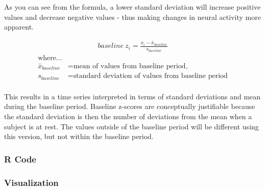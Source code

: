 \documentclass[
]{book}
\newenvironment{Shaded}{\begin{snugshade}}{\end{snugshade}}
\newcommand{\CommentTok}[1]{\textcolor[rgb]{0.56,0.35,0.01}{\textit{#1}}}
\newcommand{\DataTypeTok}[1]{\textcolor[rgb]{0.13,0.29,0.53}{#1}}
\newcommand{\DecValTok}[1]{\textcolor[rgb]{0.00,0.00,0.81}{#1}}
\newcommand{\KeywordTok}[1]{\textcolor[rgb]{0.13,0.29,0.53}{\textbf{#1}}}
\newcommand{\NormalTok}[1]{#1}
\newcommand{\OperatorTok}[1]{\textcolor[rgb]{0.81,0.36,0.00}{\textbf{#1}}}
\newcommand{\StringTok}[1]{\textcolor[rgb]{0.31,0.60,0.02}{#1}}
\begin{document}
As you can see from the formula, a lower standard deviation will increase positive values and decrease negative values - thus making changes in neural activity more apparent.

\begin{gather*}
  baseline \ z_{i} = \frac{x_{i}-\bar{x}_{baseline}}{s_{baseline}}
\end{gather*}
\begin{align*}
  \text{where...} \\
  \bar{x}_{baseline} &= \text{mean of values from baseline period,} \\
  {s}_{baseline} &= \text{standard deviation of values from baseline period} \\
\end{align*}

This results in a time series interpreted in terms of standard deviations and mean during the baseline period. Baseline z-scores are conceptually justifiable because the standard deviation is then the number of deviations from the mean when a subject is at rest. The values outside of the baseline period will be different using this version, but not within the baseline period.

\hypertarget{stand-methods-bzscore-code}{%
\subsubsection{R Code}\label{stand-methods-bzscore-code}}

\begin{Shaded}
\end{Shaded}

\hypertarget{stand-methods-bzscore-vis}{%
\subsubsection{Visualization}\label{stand-methods-bzscore-vis}}
\end{document}
